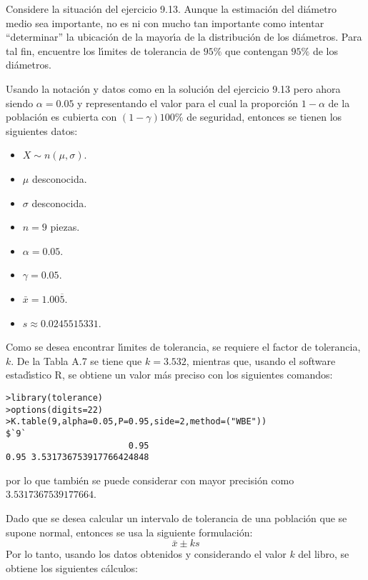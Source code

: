 \begin{enunciado}
 Considere la situaci\'on del ejercicio 9.13. Aunque la estimaci\'on del di\'ametro medio sea importante, no es ni con mucho tan importante como intentar ``determinar'' la ubicaci\'on de la mayor\'{\i}a de la distribuci\'on de los di\'ametros. Para tal fin, encuentre los l\'{\i}mites de tolerancia de $95\%$ que contengan $95\%$ de los di\'ametros.
\end{enunciado}

\begin{solucion}
 Usando la notaci\'on y datos como en la soluci\'on del ejercicio 9.13 pero ahora siendo $\alpha = 0.05$ y representando el valor para el cual la proporci\'on $1-\alpha$ de la poblaci\'on es cubierta con $(1-\gamma)100\%$ de seguridad, entonces se tienen los siguientes datos:
 \begin{itemize}
  \item $X\sim n(\mu,\sigma)$.
  \item $\mu$ desconocida.
  \item $\sigma$ desconocida.
  \item $n = 9$ piezas.
  \item $\alpha = 0.05$.
  \item $\gamma = 0.05$.
  \item $\bar{x} = 1.00\overline{5}$.
  \item $s \approx 0.0245515331$.
 \end{itemize}
 Como se desea encontrar l\'{\i}mites de tolerancia, se requiere el factor de tolerancia, $k$. De la Tabla A.7 se tiene que $k = 3.532$, mientras que, usando el software estad\'{\i}stico R, se obtiene un valor m\'as preciso con los siguientes comandos:
 \begin{verbatim}
>library(tolerance)
>options(digits=22)
>K.table(9,alpha=0.05,P=0.95,side=2,method=("WBE"))
$`9`
                        0.95
0.95 3.531736753917766424848
 \end{verbatim}
 \vspace{-0.5cm}
 por lo que tambi\'en se puede considerar con mayor precisi\'on como $3.5317367539177664$.
 \par 
 Dado que se desea calcular un intervalo de tolerancia de una poblaci\'on que se supone normal, entonces se usa la siguiente formulaci\'on:
 \begin{equation*}
  \bar{x} \pm ks
 \end{equation*}
 Por lo tanto, usando los datos obtenidos y considerando el valor $k$ del libro, se obtiene los siguientes c\'alculos:

\end{solucion}
